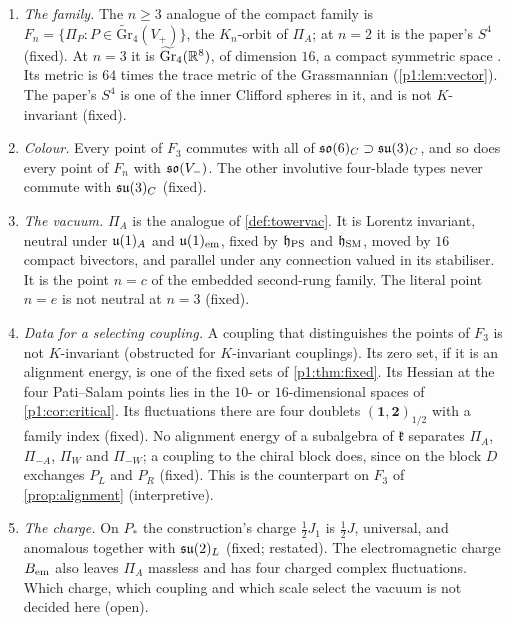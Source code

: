 \begin{enumerate}[label=(\alph*),leftmargin=2.2em]
\item \emph{The family.} The $n\ge3$ analogue of the compact family is $F_n=\{\Pi_P:P\in\widetilde{\mathrm{Gr}}_4(V_+)\}$, the $K_n$-orbit of $\Pi_A$; at $n=2$ it is the paper's $S^4$
(fixed). At $n=3$ it is $\widetilde{\mathrm{Gr}}_4(\mathbb{R}^8)$, of dimension $16$, a compact symmetric space \cite{Helgason}. Its metric is $64$ times the trace metric of the
Grassmannian (\cref{p1:lem:vector}). The paper's $S^4$ is one of the inner Clifford spheres in it, and is not $K$-invariant (fixed).
\item \emph{Colour.} Every point of $F_3$ commutes with all of $\mathfrak{so}(6)_C\supset\mathfrak{su}(3)_C$, and so does every point of $F_n$ with $\mathfrak{so}(V_-)$. The other involutive four-blade types never
commute with $\mathfrak{su}(3)_C$ (fixed).
\item \emph{The vacuum.} $\Pi_A$ is the analogue of \cref{def:towervac}. It is Lorentz invariant, neutral under $\mathfrak{u}(1)_A$ and $\mathfrak{u}(1)_{\rm em}$, fixed by $\mathfrak h_{\rm PS}$ and
$\mathfrak h_{\rm SM}$, moved by $16$ compact bivectors, and parallel under any connection valued in its stabiliser. It is the point $n=c$ of the embedded second-rung
family. The literal point $n=e$ is not neutral at $n=3$ (fixed).
\item \emph{Data for a selecting coupling.} A coupling that distinguishes the points of $F_3$ is not $K$-invariant (obstructed for $K$-invariant couplings). Its zero set, if it is
an alignment energy, is one of the fixed sets of \cref{p1:thm:fixed}. Its Hessian at the four Pati--Salam points lies in the $10$- or $16$-dimensional spaces of
\cref{p1:cor:critical}. Its fluctuations there are four doublets $(\mathbf1,\mathbf2)_{1/2}$ with a family index (fixed). No alignment energy of a subalgebra of $\mathfrak k$
separates $\Pi_A$, $\Pi_{-A}$, $\Pi_W$ and $\Pi_{-W}$; a coupling to the chiral block does, since on the block $D$ exchanges $P_L$ and $P_R$ (fixed). This is the
counterpart on $F_3$ of \cref{prop:alignment} (interpretive).
\item \emph{The charge.} On $P_*$ the construction's charge $\tfrac12J_1$ is $\tfrac12J$, universal, and anomalous together with $\mathfrak{su}(2)_L$ (fixed; restated). The electromagnetic
charge $B_{\rm em}$ also leaves $\Pi_A$ massless and has four charged complex fluctuations. Which charge, which coupling and which scale select the vacuum is not decided
here (open).
\end{enumerate}

